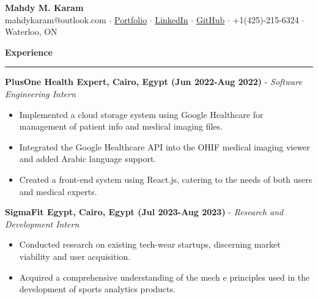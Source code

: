\documentclass[10pt]{article}
\begin{document}
\begin{center}
    {\large \textbf{Mahdy M. Karam}} \\[0.1em]  %
    \small
    mahdykaram@outlook.com $ \cdot $ 
    \href{https://mmkaram.github.io}{Portfolio} $ \cdot $ 
    \href{https://www.linkedin.com/in/mahdykaram}{LinkedIn} $ \cdot $ 
    \href{https://github.com/mmkaram}{GitHub} $ \cdot $
    +1(425)-215-6324 $ \cdot $ Waterloo, ON
\end{center}

\noindent
\textbf{Experience} \\
\rule{\textwidth}{0.4pt} %

\textbf{PlusOne Health Expert, Cairo, Egypt (Jun 2022-Aug 2022)} - \textit{Software Engineering Intern}
\begin{itemize}
    \small %
    \setlength{\itemsep}{0pt} %
    \setlength{\parskip}{0pt} %
    \item Implemented a cloud storage system using Google Healthcare for management of patient info and medical imaging files.
    \item Integrated the Google Healthcare API into the OHIF medical imaging viewer and added Arabic language support.
    \item Created a front-end system using React.js, catering to the needs of both users and medical experts.
\end{itemize}

\textbf{SigmaFit Egypt, Cairo, Egypt (Jul 2023-Aug 2023)} - \textit{Research and Development Intern}
\begin{itemize}
    \small %
    \setlength{\itemsep}{-1pt} %
    \setlength{\parskip}{0pt} %
    \item Conducted research on existing tech-wear startups, discerning market viability and user acquisition.
    \item Acquired a comprehensive understanding of the mech e principles used in the development of sports analytics products.
\end{itemize}
\end{document}
